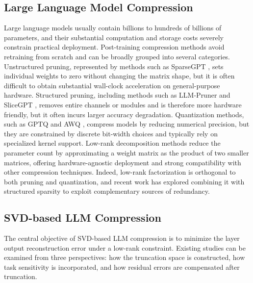 \documentclass[a4paper,fleqn]{cas-dc}
\begin{document}
\subsection{Large Language Model Compression}

Large language models usually contain billions to hundreds of billions of parameters, and their substantial computation and storage costs severely constrain practical deployment. Post-training compression methods avoid retraining from scratch and can be broadly grouped into several categories. Unstructured pruning, represented by methods such as SparseGPT \citep{frantar2023sparsegpt}, sets individual weights to zero without changing the matrix shape, but it is often difficult to obtain substantial wall-clock acceleration on general-purpose hardware. Structured pruning, including methods such as LLM-Pruner \citep{ma2023llmpruner} and SliceGPT \citep{ashkboos2024slicegpt}, removes entire channels or modules and is therefore more hardware friendly, but it often incurs larger accuracy degradation. Quantization methods, such as GPTQ \citep{frantar2023gptq} and AWQ \citep{lin2023awq}, compress models by reducing numerical precision, but they are constrained by discrete bit-width choices and typically rely on specialized kernel support. Low-rank decomposition methods \citep{hu2022lora,kaushal2023lord,sharma2023laser} reduce the parameter count by approximating a weight matrix as the product of two smaller matrices, offering hardware-agnostic deployment and strong compatibility with other compression techniques. Indeed, low-rank factorization is orthogonal to both pruning and quantization, and recent work has explored combining it with structured sparsity \citep{zong2025sslc,tao2025lsprism} to exploit complementary sources of redundancy.

\subsection{SVD-based LLM Compression}

The central objective of SVD-based LLM compression is to minimize the layer output reconstruction error under a low-rank constraint. Existing studies can be examined from three perspectives: how the truncation space is constructed, how task sensitivity is incorporated, and how residual errors are compensated after truncation.
\end{document}
